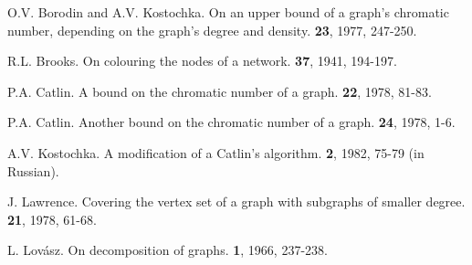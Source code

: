 \documentclass[12pt]{article}
\theoremstyle{plain}
\theoremstyle{definition}
\theoremstyle{remark}
\begin{document}
\begin{thebibliography}{1}
O.V. Borodin and A.V. Kostochka.
\newblock On an upper bound of a graph's chromatic number, depending on the graph's degree and density.
 \textbf{23}, 1977, \mbox{247-250.}

R.L. Brooks. 
\newblock On colouring the nodes of a network.
 \textbf{37}, 1941, \mbox{194-197.}

P.A. Catlin.
\newblock A bound on the chromatic number of a graph.
 \textbf{22}, 1978, \mbox{81-83}.

P.A. Catlin.
\newblock Another bound on the chromatic number of a graph.
 \textbf{24}, 1978, \mbox{1-6}.

A.V. Kostochka. 
\newblock A modification of a Catlin's algorithm.
 \textbf{2}, 1982, \mbox{75-79} (in Russian).

J. Lawrence.
\newblock Covering the vertex set of a graph with subgraphs of smaller degree.
 \textbf{21}, 1978, \mbox{61-68}.

L. Lov\'{a}sz.
\newblock On decomposition of graphs.
 \textbf{1}, 1966, \mbox{237-238}.
\end{thebibliography}
\end{document}

